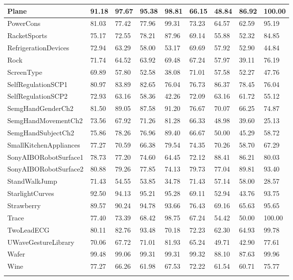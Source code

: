 \begin{landscape}
\begin{longtable}{|l|llll|llll|}
    Plane & 91.18 & 97.67 & 95.38 & 98.81 & 66.15 & 48.84 & 86.92 & 100.00 \\ \hline
    PowerCons & 81.03 & 77.42 & 77.96 & 99.31 & 73.23 & 64.57 & 62.59 & 95.19 \\ \hline
    RacketSports & 75.17 & 72.55 & 78.21 & 87.96 & 69.14 & 55.88 & 52.32 & 84.85 \\ \hline
    RefrigerationDevices & 72.94 & 63.29 & 58.00 & 53.17 & 69.69 & 57.92 & 52.90 & 44.84 \\ \hline
    Rock & 71.74 & 64.52 & 63.92 & 69.48 & 67.24 & 57.97 & 39.11 & 76.19 \\ \hline
    ScreenType & 69.89 & 57.80 & 52.58 & 38.08 & 71.01 & 57.58 & 52.27 & 47.76 \\ \hline
    SelfRegulationSCP1 & 80.97 & 83.89 & 82.65 & 76.04 & 76.73 & 86.37 & 78.45 & 76.04 \\ \hline
    SelfRegulationSCP2 & 72.93 & 63.16 & 58.36 & 42.26 & 72.09 & 63.16 & 61.72 & 55.12 \\ \hline
    SemgHandGenderCh2 & 81.50 & 89.05 & 87.58 & 91.20 & 76.67 & 70.07 & 66.25 & 74.87 \\ \hline
    SemgHandMovementCh2 & 73.56 & 67.92 & 71.26 & 81.28 & 66.33 & 48.98 & 39.60 & 25.13 \\ \hline
    SemgHandSubjectCh2 & 75.86 & 78.26 & 76.96 & 89.40 & 66.67 & 50.00 & 45.29 & 58.72 \\ \hline
    SmallKitchenAppliances & 77.27 & 70.59 & 66.38 & 79.54 & 74.35 & 70.26 & 58.70 & 67.29 \\ \hline
    SonyAIBORobotSurface1 & 78.73 & 77.20 & 74.60 & 64.45 & 72.12 & 88.41 & 86.21 & 80.03 \\ \hline
    SonyAIBORobotSurface2 & 80.88 & 79.26 & 77.85 & 74.13 & 79.73 & 77.04 & 89.81 & 93.40 \\ \hline
    StandWalkJump & 71.43 & 54.55 & 53.85 & 34.78 & 71.43 & 57.14 & 58.00 & 28.57 \\ \hline
    StarlightCurves & 92.50 & 94.13 & 95.21 & 95.28 & 69.11 & 52.94 & 43.76 & 93.75 \\ \hline
    Strawberry & 89.57 & 90.24 & 94.78 & 93.66 & 76.43 & 69.16 & 65.63 & 95.65 \\ \hline
    Trace & 77.40 & 73.39 & 68.42 & 98.75 & 67.24 & 54.42 & 50.00 & 100.00 \\ \hline
    TwoLeadECG & 80.11 & 82.76 & 93.48 & 70.18 & 72.23 & 62.30 & 64.93 & 99.78 \\ \hline
    UWaveGestureLibrary & 70.06 & 67.72 & 71.01 & 81.93 & 65.24 & 49.71 & 42.90 & 77.61 \\ \hline
    Wafer & 99.48 & 99.06 & 99.31 & 99.31 & 99.32 & 88.10 & 87.63 & 99.96 \\ \hline
    Wine & 77.27 & 66.26 & 61.98 & 67.53 & 72.22 & 61.54 & 60.71 & 75.77 \\ \hline
  \label{tab:longresults_1}
  \end{longtable}
\end{landscape}

